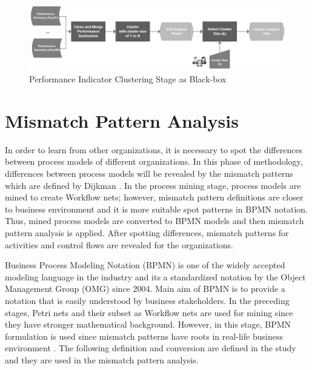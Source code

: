 \begin{figure}
  \centering
  \includegraphics[width=\textwidth]{4_methodology/performance-indicator-clustering-blackbox}
  \caption{Performance Indicator Clustering Stage as Black-box }
  \label{fig:performance-indicator-clustering-blackbox}
\end{figure}

\section{Mismatch Pattern Analysis}
\label{sec:mismatch-pattern-analysis}
In order to learn from other organizations, it is necessary to spot the differences between process models of different organizations. In this phase of methodology, differences between process models will be revealed by the mismatch patterns which are defined by Dijkman \cite{dijkman2007mismatch}. In the process mining stage, process models are mined to create Workflow nets; however, mismatch pattern definitions are closer to business environment and it is more suitable spot patterns in BPMN notation. Thus, mined process models are converted to BPMN models and then mismatch pattern analysis is applied. After spotting differences, mismatch patterns for activities and control flows are revealed for the organizations.

Business Process Modeling Notation (BPMN) is one of the widely accepted modeling language in the industry and its a standardized notation by the Object Management Group (OMG) since 2004. Main aim of BPMN is to provide a notation that is easily understood by business stakeholders. In the preceding stages, Petri nets and their subset as Workflow nets are used for mining since they have stronger mathematical background. However, in this stage, BPMN formulation is used since mismatch patterns have roots in real-life business environment \cite{dijkman2007mismatch}. The following definition and conversion are defined in the study \cite{kalenkovaprocess} and they are used in the mismatch pattern analysis. 

